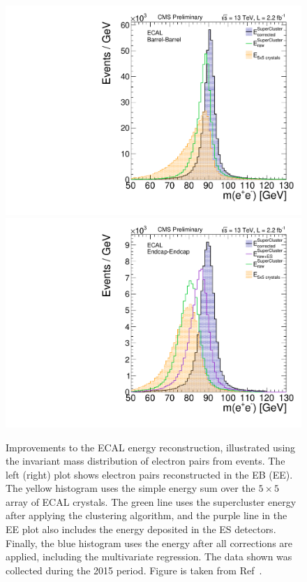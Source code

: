 \begin{figure}[htb!]
  \centering
  \includegraphics[width=.49\textwidth]{Figures/cms/zee_mass_bb.pdf}
  \includegraphics[width=.49\textwidth]{Figures/cms/zee_mass_ee.pdf}
  \caption[Impact of the shower energy reconstruction]
  {
    Improvements to the ECAL energy reconstruction, illustrated using the invariant mass distribution of electron pairs from \Zee events. The left (right) plot shows electron pairs reconstructed in the EB (EE). The yellow histogram uses the simple energy sum over the $5\times5$ array of ECAL crystals. The green line uses the supercluster energy after applying the clustering algorithm, and the purple line in the EE plot also includes the energy deposited in the ES detectors. Finally, the blue histogram uses the energy after all corrections are applied, including the multivariate regression. The data shown was collected during the 2015 period. Figure is taken from Ref~\cite{CMS-DP-2015-057}.
  }
  \label{fig:shower_energy_reconstruction}
\end{figure}

